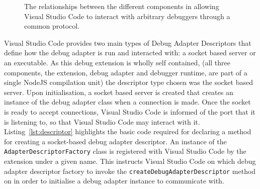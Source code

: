 \documentclass[12pt,pdftex,titlepage]{report}
\begin{document}
            \begin{figure}[hbt!]
                \centering
                \caption{The relationships between the different components in allowing Visual Studio Code to interact with arbitrary debuggers through a common protocol.}
                \label{fig:vscodedebug}
            \end{figure}

            Visual Studio Code provides two main types of Debug Adapter Descriptors that define how the debug adapter is run and interacted with: a socket based server or an executable. As this debug extension is wholly self contained, 
            (all three components, the extension, debug adapter and debugger runtime, are part of a single NodeJS compilation unit) the descriptor type chosen was the socket based server. Upon initialisation, a socket based server is 
            created that creates an instance of the debug adapter class when a connection is made. Once the socket is ready to accept connections, Visual Studio Code is informed of the port that it is listening to, so that Visual Studio 
            Code may interact with it. Listing~\ref{lst:descriptor} highlights the basic code required for declaring a method for creating a socket-based debug adapter descriptor. An instance of the \texttt{AdapterDescriptorFactory} class 
            is registered with Visual Studio Code by the extension under a given name. This instructs Visual Studio Code on which debug adapter descriptor factory to invoke the \texttt{createDebugAdapterDescriptor} method on in order to 
            initialise a debug adapter instance to communicate with.
\end{document}
